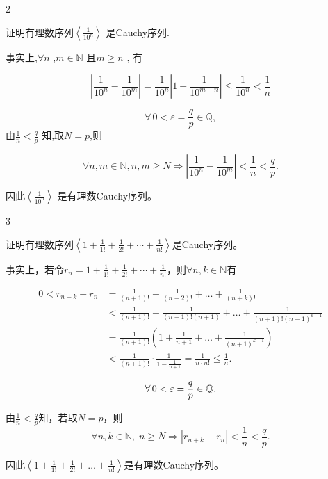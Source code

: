 \begin{sourceexample}{2}

证明有理数序列\(\left\langle \frac{1}{10^n} \right\rangle\) 是Cauchy序列.

事实上,\(\forall n\) ,\(m \in \mathbb{N}\) 且\(m \geqslant n\) , 有

\[\left| \frac{1}{10^n} - \frac{1}{10^m} \right| = \frac{1}{10^n} \left| 1 - \frac{1}{10^{m-n}} \right| \le \frac{1}{10^n} < \frac{1}{n}\]

\[\forall\,0<\varepsilon=\frac{q}{p}\in\mathbb Q,\]
由\(\frac1n<\frac qp\) 知,取\(N=p\),则

\[\forall n, m \in \mathbb{N}, n, m \geqslant N \Longrightarrow \left| \frac{1}{10^n} - \frac{1}{10^m} \right| < \frac{1}{n} < \frac{q}{p}.\]

因此\(\left\langle \frac{1}{10^n}\right\rangle\) 是有理数Cauchy序列。

\end{sourceexample}



\begin{sourceexample}{3}

证明有理数序列\(\left\langle 1 + \frac{1}{1!} + \frac{1}{2!} + \cdots + \frac{1}{n!} \right\rangle\)是Cauchy序列。

事实上，若令\(r_n = 1 + \frac{1}{1!} + \frac{1}{2!} + \cdots + \frac{1}{n!}\)，则\(\forall n, k \in \mathbb{N}\)有

\begin{align*}
	0 < r_{n+k} - r_n &= \frac{1}{(n+1)!} + \frac{1}{(n+2)!} + \dots + \frac{1}{(n+k)!} \\
	&< \frac{1}{(n+1)!} + \frac{1}{(n+1)!(n+1)} + \dots + \frac{1}{(n+1)!(n+1)^{k-1}} \\
	&= \frac{1}{(n+1)!}\left(1 + \frac{1}{n+1} + \dots + \frac{1}{(n+1)^{k-1}}\right) \\
	&< \frac{1}{(n+1)!} \cdot \frac{1}{1 - \frac{1}{n+1}} = \frac{1}{n \cdot n!} \le \frac{1}{n}.
\end{align*}


\[\forall\,0<\varepsilon=\frac{q}{p}\in\mathbf {\mathbb{Q}},\]

由\(\frac1n<\frac qp\)知，若取\(N=p\)，则
\[
\forall n, k \in \mathbb{N},\; n \geqslant N \Longrightarrow |r_{n+k} - r_n| < \frac{1}{n} < \frac{q}{p}.
\]

因此\(\left\langle 1 + \frac{1}{1!} + \frac{1}{2!} + \dots + \frac{1}{n!} \right\rangle\)是有理数Cauchy序列。


\end{sourceexample}


